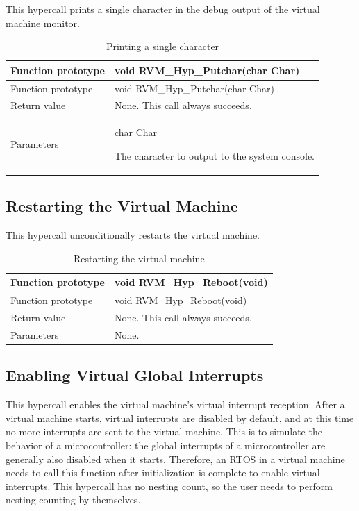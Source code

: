 This hypercall prints a single character in the debug output of the virtual machine monitor.

\begin{xltabular}{\textwidth}{@{}>{\hsize\raggedright\arraybackslash}X>{\hsize\raggedright\arraybackslash}X@{}}
\caption{Printing a single character}\label{tab:4-5}\\
\toprule
Function prototype & void RVM\_\allowbreak{}Hyp\_\allowbreak{}Putchar(char Char)\tabularnewline
\endfirsthead
\toprule
Function prototype & void RVM\_\allowbreak{}Hyp\_\allowbreak{}Putchar(char Char)\tabularnewline
\midrule
\endhead
\bottomrule
\endlastfoot
Return value & None. This call always succeeds.\tabularnewline
Parameters\strut
 & char Char

The character to output to the system console.\strut
\tabularnewline
\end{xltabular}

\subsection{Restarting the Virtual Machine}\label{subsec:4-4-2}

This hypercall unconditionally restarts the virtual machine.

\begin{xltabular}{\textwidth}{@{}>{\hsize\raggedright\arraybackslash}X>{\hsize\raggedright\arraybackslash}X@{}}
\caption{Restarting the virtual machine}\label{tab:4-6}\\
\toprule
Function prototype & void RVM\_\allowbreak{}Hyp\_\allowbreak{}Reboot(void)\tabularnewline
\endfirsthead
\toprule
Function prototype & void RVM\_\allowbreak{}Hyp\_\allowbreak{}Reboot(void)\tabularnewline
\midrule
\endhead
\bottomrule
\endlastfoot
Return value & None. This call always succeeds.\tabularnewline
Parameters & None.\tabularnewline
\end{xltabular}

\subsection{Enabling Virtual Global Interrupts}\label{subsec:4-4-3}

This hypercall enables the virtual machine's virtual interrupt reception. After a virtual machine starts, virtual interrupts are disabled by default, and at this time no more interrupts are sent to the virtual machine. This is to simulate the behavior of a microcontroller: the global interrupts of a microcontroller are generally also disabled when it starts. Therefore, an RTOS in a virtual machine needs to call this function after initialization is complete to enable virtual interrupts. This hypercall has no nesting count, so the user needs to perform nesting counting by themselves.


